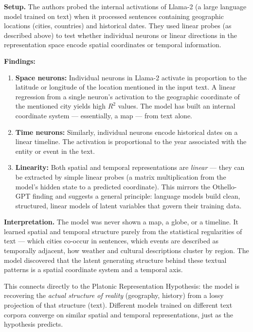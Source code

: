 \documentclass[11pt, a4paper]{article}
\begin{document}
\textbf{Setup.} The authors probed the internal activations of Llama-2
(a large language model trained on text) when it processed sentences
containing geographic locations (cities, countries) and historical dates.
They used linear probes (as described above) to test whether individual
neurons or linear directions in the representation space encode spatial
coordinates or temporal information.

\textbf{Findings:}

\begin{enumerate}[leftmargin=2em]
  \item \textbf{Space neurons:} Individual neurons in Llama-2 activate
    in proportion to the latitude or longitude of the location mentioned
    in the input text. A linear regression from a single neuron's
    activation to the geographic coordinate of the mentioned city yields
    high $R^2$ values. The model has built an internal coordinate system
    --- essentially, a map --- from text alone.

  \item \textbf{Time neurons:} Similarly, individual neurons encode
    historical dates on a linear timeline. The activation is proportional
    to the year associated with the entity or event in the text.

  \item \textbf{Linearity:} Both spatial and temporal representations are
    \emph{linear} --- they can be extracted by simple linear probes (a
    matrix multiplication from the model's hidden state to a predicted
    coordinate). This mirrors the Othello-GPT finding and suggests a
    general principle: language models build clean, structured, linear
    models of latent variables that govern their training data.
\end{enumerate}

\textbf{Interpretation.} The model was never shown a map, a globe, or a
timeline. It learned spatial and temporal structure purely from the
statistical regularities of text --- which cities co-occur in sentences,
which events are described as temporally adjacent, how weather and
cultural descriptions cluster by region. The model discovered that the
latent generating structure behind these textual patterns is a spatial
coordinate system and a temporal axis.

This connects directly to the Platonic Representation Hypothesis: the
model is recovering the \emph{actual structure of reality} (geography,
history) from a lossy projection of that structure (text). Different
models trained on different text corpora converge on similar spatial and
temporal representations, just as the hypothesis predicts.
\end{document}
